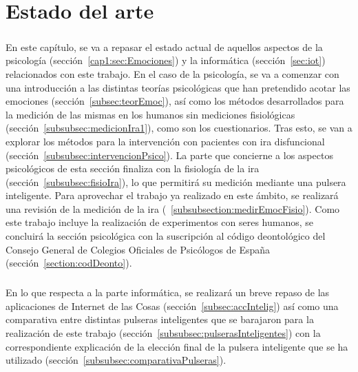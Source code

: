%
%

\chapter{Estado del arte}

\paragraph{}
En este capítulo, se va a repasar el estado actual de aquellos aspectos de la psicología (sección~\ref{cap1:sec:Emociones}) y la informática (sección~\ref{sec:iot}) relacionados con este trabajo. En el caso de la psicología, se va a comenzar con una introducción a las distintas teorías psicológicas que han pretendido acotar las emociones (sección~\ref{subsec:teorEmoc}), así como los métodos desarrollados para la medición de las mismas en los humanos sin mediciones fisiológicas (sección~\ref{subsubsec:medicionIra1}), como son los cuestionarios. Tras esto, se van a explorar los métodos para la intervención con pacientes con ira disfuncional (sección~\ref{subsubsec:intervencionPsico}). La parte que concierne a los aspectos psicológicos de esta sección finaliza con la fisiología de la ira (sección~\ref{subsubsec:fisioIra}), lo que permitirá su medición mediante una pulsera inteligente. Para aprovechar el trabajo ya realizado en este ámbito, se realizará una revisión de la medición de la ira (~\ref{subsubsection:medirEmocFisio}). Como este trabajo incluye la realización de experimentos con seres humanos, se concluirá la sección psicológica con la suscripción al código deontológico del Consejo General de Colegios Oficiales de Psicólogos de España (sección~\ref{section:codDeonto}).

\paragraph{}
En lo que respecta a la parte informática, se realizará un breve repaso de las aplicaciones de Internet de las Cosas (sección~\ref{subsec:accIntelig}) así como una comparativa entre distintas pulseras inteligentes que se barajaron para la realización de este trabajo (sección~\ref{subsubsec:pulserasInteligentes}) con la correspondiente explicación de la elección final de la pulsera inteligente que se ha utilizado (sección~\ref{subsubsec:comparativaPulseras}).

